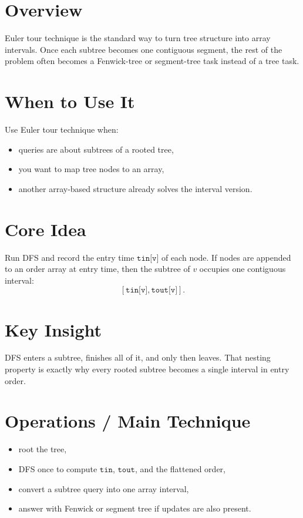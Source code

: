 \section*{Overview}

Euler tour technique is the standard way to turn tree structure into array intervals. Once each subtree becomes one
contiguous segment, the rest of the problem often becomes a Fenwick-tree or segment-tree task instead of a tree task.

\section*{When to Use It}

Use Euler tour technique when:

\begin{itemize}
  \item queries are about subtrees of a rooted tree,
  \item you want to map tree nodes to an array,
  \item another array-based structure already solves the interval version.
\end{itemize}

\section*{Core Idea}

Run DFS and record the entry time \(\texttt{tin[v]}\) of each node. If nodes are appended to an order array at entry
time, then the subtree of \(v\) occupies one contiguous interval:
\[
[\texttt{tin[v]}, \texttt{tout[v]}].
\]

\section*{Key Insight}

DFS enters a subtree, finishes all of it, and only then leaves. That nesting property is exactly why every rooted
subtree becomes a single interval in entry order.

\section*{Operations / Main Technique}

\begin{itemize}
  \item root the tree,
  \item DFS once to compute \(\texttt{tin}\), \(\texttt{tout}\), and the flattened order,
  \item convert a subtree query into one array interval,
  \item answer with Fenwick or segment tree if updates are also present.
\end{itemize}

